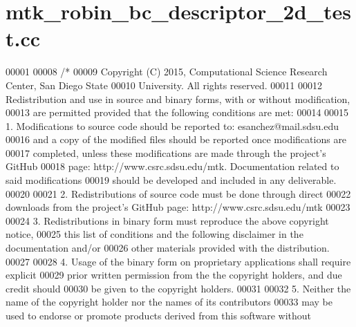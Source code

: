 \hypertarget{mtk__robin__bc__descriptor__2d__test_8cc_source}{\section{mtk\+\_\+robin\+\_\+bc\+\_\+descriptor\+\_\+2d\+\_\+test.\+cc}
\label{mtk__robin__bc__descriptor__2d__test_8cc_source}
}

\begin{DoxyCode}
00001 
00008 \textcolor{comment}{/*}
00009 \textcolor{comment}{Copyright (C) 2015, Computational Science Research Center, San Diego State}
00010 \textcolor{comment}{University. All rights reserved.}
00011 \textcolor{comment}{}
00012 \textcolor{comment}{Redistribution and use in source and binary forms, with or without modification,}
00013 \textcolor{comment}{are permitted provided that the following conditions are met:}
00014 \textcolor{comment}{}
00015 \textcolor{comment}{1. Modifications to source code should be reported to: esanchez@mail.sdsu.edu}
00016 \textcolor{comment}{and a copy of the modified files should be reported once modifications are}
00017 \textcolor{comment}{completed, unless these modifications are made through the project's GitHub}
00018 \textcolor{comment}{page: http://www.csrc.sdsu.edu/mtk. Documentation related to said modifications}
00019 \textcolor{comment}{should be developed and included in any deliverable.}
00020 \textcolor{comment}{}
00021 \textcolor{comment}{2. Redistributions of source code must be done through direct}
00022 \textcolor{comment}{downloads from the project's GitHub page: http://www.csrc.sdsu.edu/mtk}
00023 \textcolor{comment}{}
00024 \textcolor{comment}{3. Redistributions in binary form must reproduce the above copyright notice,}
00025 \textcolor{comment}{this list of conditions and the following disclaimer in the documentation and/or}
00026 \textcolor{comment}{other materials provided with the distribution.}
00027 \textcolor{comment}{}
00028 \textcolor{comment}{4. Usage of the binary form on proprietary applications shall require explicit}
00029 \textcolor{comment}{prior written permission from the the copyright holders, and due credit should}
00030 \textcolor{comment}{be given to the copyright holders.}
00031 \textcolor{comment}{}
00032 \textcolor{comment}{5. Neither the name of the copyright holder nor the names of its contributors}
00033 \textcolor{comment}{may be used to endorse or promote products derived from this software without}

\end{DoxyCode}
